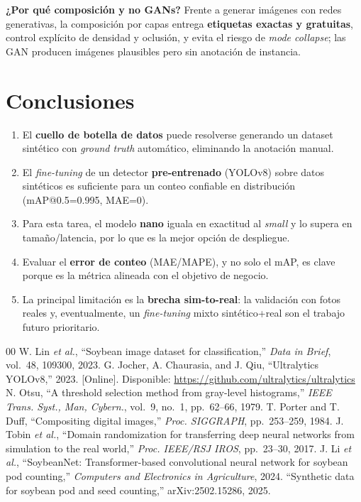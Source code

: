 \documentclass[conference]{IEEEtran}
\begin{document}
\textbf{¿Por qué composición y no GANs?} Frente a generar imágenes con redes
generativas, la composición por capas entrega \textbf{etiquetas exactas y gratuitas},
control explícito de densidad y oclusión, y evita el riesgo de \textit{mode
collapse}; las GAN producen imágenes plausibles pero sin anotación de instancia.

\section{Conclusiones}
\begin{enumerate}
\item El \textbf{cuello de botella de datos} puede resolverse generando un dataset
sintético con \emph{ground truth} automático, eliminando la anotación manual.
\item El \emph{fine-tuning} de un detector \textbf{pre-entrenado} (YOLOv8) sobre
datos sintéticos es suficiente para un conteo confiable en distribución
(mAP@0.5=0.995, MAE=0).
\item Para esta tarea, el modelo \textbf{nano} iguala en exactitud al \textit{small}
y lo supera en tamaño/latencia, por lo que es la mejor opción de despliegue.
\item Evaluar el \textbf{error de conteo} (MAE/MAPE), y no solo el mAP, es clave
porque es la métrica alineada con el objetivo de negocio.
\item La principal limitación es la \textbf{brecha sim-to-real}: la validación con
fotos reales y, eventualmente, un \emph{fine-tuning} mixto sintético+real son el
trabajo futuro prioritario.
\end{enumerate}

\begin{thebibliography}{00}
 W. Lin \textit{et al.}, ``Soybean image dataset for
classification,'' \textit{Data in Brief}, vol.~48, 109300, 2023.
 G. Jocher, A. Chaurasia, and J. Qiu, ``Ultralytics YOLOv8,''
2023. [Online]. Disponible: \url{https://github.com/ultralytics/ultralytics}
 N. Otsu, ``A threshold selection method from gray-level
histograms,'' \textit{IEEE Trans. Syst., Man, Cybern.}, vol.~9, no.~1, pp.~62--66,
1979.
 T. Porter and T. Duff, ``Compositing digital images,''
\textit{Proc. SIGGRAPH}, pp.~253--259, 1984.
 J. Tobin \textit{et al.}, ``Domain randomization for
transferring deep neural networks from simulation to the real world,''
\textit{Proc. IEEE/RSJ IROS}, pp.~23--30, 2017.
J. Li \textit{et al.}, ``SoybeanNet: Transformer-based convolutional neural
network for soybean pod counting,'' \textit{Computers and Electronics in
Agriculture}, 2024.
``Synthetic data for soybean pod and seed counting,'' arXiv:2502.15286, 2025.
\end{thebibliography}
\end{document}
